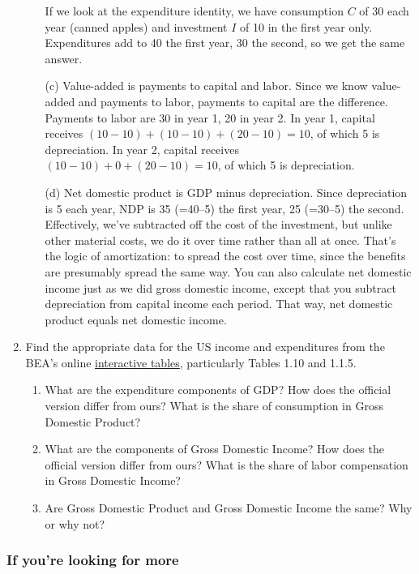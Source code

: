 \documentclass[12pt,letterpaper]{article}
\begin{document}
\begin{enumerate}
\begin{enumerate}
If we look at the expenditure identity, we have consumption $C$
of 30 each year (canned apples) and investment $I$
of 10 in the first year only.
Expenditures add to 40 the first year, 30 the second,
so we get the same answer.

\item [(c)] Value-added is payments to capital and labor.  Since
we know value-added and payments to labor,
payments to capital are the difference.
Payments to labor are 30 in year 1, 20 in year 2.
In year 1, capital receives $(10-10) + (10-10) + (20-10) = 10$,
of which 5 is depreciation.
In year 2, capital receives $(10-10) + 0 + (20-10) = 10$,
of which 5 is depreciation.

\item[(d)] Net domestic product is GDP minus depreciation.
Since depreciation is 5 each year,
NDP is 35 (=40--5) the first year, 25 (=30--5) the second.
Effectively, we've subtracted off the cost of the investment,
but unlike other material costs, we do it over time rather
than all at once.
That's the logic of amortization:  to spread the cost over time,
since the benefits are presumably spread the same way.
You can also calculate net domestic income just as we did
gross domestic income, except that you subtract depreciation
from capital income each period.
That way, net domestic product equals net domestic income.
\end{enumerate}

\item Find the appropriate data for the US
income and expenditures from the BEA's online
\href{http://www.bea.gov/National/nipaweb/index.asp}{interactive tables},
particularly Tables 1.10 and 1.1.5.
%
\begin{enumerate}
\item What are the expenditure components of GDP?
How does the official version differ from ours?
What is the share of consumption in Gross Domestic Product?
\item What are the components of Gross Domestic Income?
How does the official version differ from ours?
What is the share of labor compensation in Gross Domestic Income?
\item Are Gross Domestic Product and Gross Domestic Income
the same?
Why or why not?
\end{enumerate}

\end{enumerate}


\subsubsection*{If you're looking for more}
\end{document}
